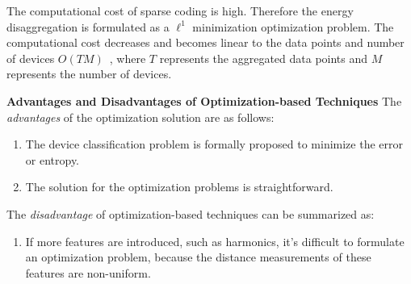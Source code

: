 The computational cost of sparse coding is high. 
Therefore the energy disaggregation is formulated as a $\ell^1$ 
minimization optimization problem. 
The computational cost decreases and becomes linear to the 
data points and number of devices $O(TM)$~\cite{li2009coordinate}, %
where $T$ represents the aggregated data points 
and $M$ represents the number of devices. 

\textbf{Advantages and Disadvantages of Optimization-based Techniques}
The \textit{advantages} of the optimization solution are as follows:
\begin{enumerate}
\item The device classification problem is formally proposed 
to minimize the error or entropy.%
\item The solution for the optimization problems is straightforward. 
\end{enumerate}
The \textit{disadvantage} of optimization-based techniques can be summarized as:
\begin{enumerate}
\item If more features are introduced, such as harmonics, 
it's difficult to formulate an optimization problem, because the 
distance measurements of these features 
are non-uniform. 

\end{enumerate}


